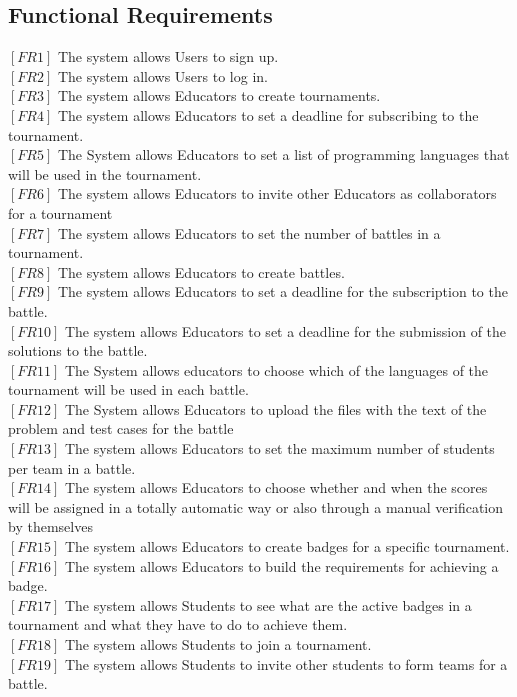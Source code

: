 \documentclass{article}
\begin{document}
\subsection{Functional Requirements}
$[FR1]$ The system allows Users to sign up.\\
$[FR2]$ The system allows Users to log in.\\
$[FR3]$ The system allows Educators to create tournaments.\\
$[FR4]$ The system allows Educators to set a deadline for subscribing to the tournament.\\
$[FR5]$ The System allows Educators to set a list of programming languages that will be used in the tournament.\\
$[FR6]$ The system allows Educators to invite other Educators as collaborators for a tournament\\
$[FR7]$ The system allows Educators to set the number of battles in a tournament.\\
$[FR8]$ The system allows Educators to create battles.\\
$[FR9]$ The system allows Educators to set a deadline for the subscription to the battle.\\
$[FR10]$ The system allows Educators to set a deadline for the submission of the solutions to the battle.\\
$[FR11]$ The System allows educators to choose which of the languages of the tournament will be used in each battle.\\
$[FR12]$ The System allows Educators to upload the files with the text of the problem and test cases for the battle\\
$[FR13]$ The system allows Educators to set the maximum number of students per team in a battle.\\
$[FR14]$ The system allows Educators to choose whether and when the scores will be assigned in a totally automatic way or also through a manual verification by themselves\\
$[FR15]$ The system allows Educators to create badges for a specific tournament.\\
$[FR16]$ The system allows Educators to build the requirements for achieving a badge.\\
$[FR17]$ The system allows Students to see what are the active badges in a tournament and what they have to do to achieve them.\\
$[FR18]$ The system allows Students to join a tournament.\\
$[FR19]$ The system allows Students to invite other students to form teams for a battle.\\
\end{document}
